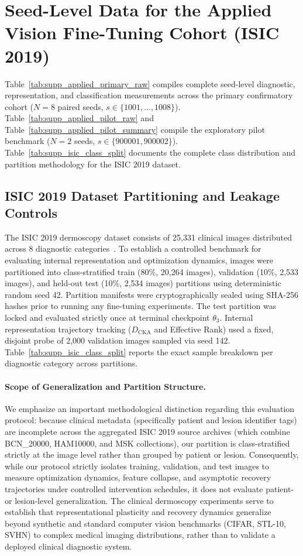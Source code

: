 \documentclass[10pt]{article}
\begin{document}
\clearpage
\section{Seed-Level Data for the Applied Vision Fine-Tuning Cohort (ISIC 2019)}\label{sec:supp_applied}

Table~\ref{tab:supp_applied_primary_raw} compiles complete seed-level diagnostic, representation, and classification measurements across the primary confirmatory cohort ($N = 8$ paired seeds, $s \in \{1001, \dots, 1008\}$). Table~\ref{tab:supp_applied_pilot_raw} and Table~\ref{tab:supp_applied_pilot_summary} compile the exploratory pilot benchmark ($N = 2$ seeds, $s \in \{900001, 900002\}$). Table~\ref{tab:supp_isic_class_split} documents the complete class distribution and partition methodology for the ISIC 2019 dataset.

\subsection{ISIC 2019 Dataset Partitioning and Leakage Controls}\label{subsec:supp_isic_split}
The ISIC 2019 dermoscopy dataset consists of 25,331 clinical images distributed across 8 diagnostic categories~\citep{codella2018skin,tschandl2018ham10000}. To establish a controlled benchmark for evaluating internal representation and optimization dynamics, images were partitioned into class-stratified train (80\%, 20,264 images), validation (10\%, 2,533 images), and held-out test (10\%, 2,534 images) partitions using deterministic random seed 42. Partition manifests were cryptographically sealed using SHA-256 hashes prior to running any fine-tuning experiments. The test partition was locked and evaluated strictly once at terminal checkpoint $\theta_3$. Internal representation trajectory tracking ($D_{\mathrm{CKA}}$ and Effective Rank) used a fixed, disjoint probe of 2,000 validation images sampled via seed 142. Table~\ref{tab:supp_isic_class_split} reports the exact sample breakdown per diagnostic category across partitions.

\paragraph{Scope of Generalization and Partition Structure.}
We emphasize an important methodological distinction regarding this evaluation protocol: because clinical metadata (specifically patient and lesion identifier tags) are incomplete across the aggregated ISIC 2019 source archives (which combine BCN\_20000, HAM10000, and MSK collections), our partition is class-stratified strictly at the image level rather than grouped by patient or lesion. Consequently, while our protocol strictly isolates training, validation, and test images to measure optimization dynamics, feature collapse, and asymptotic recovery trajectories under controlled intervention schedules, it does not evaluate patient- or lesion-level generalization. The clinical dermoscopy experiments serve to establish that representational plasticity and recovery dynamics generalize beyond synthetic and standard computer vision benchmarks (CIFAR, STL-10, SVHN) to complex medical imaging distributions, rather than to validate a deployed clinical diagnostic system.
\end{document}
